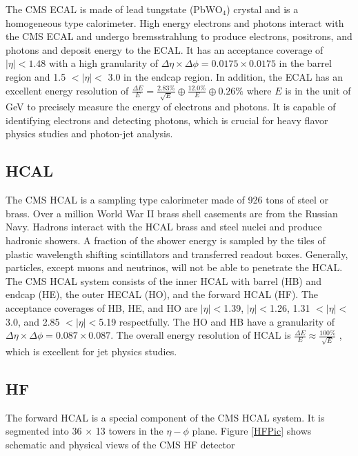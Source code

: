 The CMS ECAL is made of lead tungstate (PbWO$_4$) crystal and is a homogeneous type calorimeter. High energy electrons and photons interact with the CMS ECAL and undergo bremsstrahlung to produce electrons, positrons, and photons and deposit energy to the ECAL. It has an acceptance coverage of $|\eta| < 1.48$ with a high granularity of $\Delta \eta \times \Delta \phi = 0.0175 \times 0.0175$ in the barrel region and 1.5 $< |\eta| <$ 3.0 in the endcap region. In addition, the ECAL has an excellent energy resolution of $\frac{\Delta E}{E} = \frac{2.83\%}{\sqrt {E}} \oplus \frac{12.0\%}{E}  \oplus 0.26\%$ where $E$ is in the unit of GeV \cite{ECALReso} to precisely measure the energy of electrons and photons. It is capable of identifying electrons and detecting photons, which is crucial for heavy flavor physics studies and photon-jet analysis. 

\subsection{HCAL}

The CMS HCAL is a sampling type calorimeter made of 926 tons of steel or brass. Over a million World War II brass shell casements are from the Russian Navy. Hadrons interact with the HCAL brass and steel nuclei and produce hadronic showers. A fraction of the shower energy is sampled by the tiles of plastic wavelength shifting scintillators and transferred readout boxes. Generally, particles, except muons and neutrinos, will not be able to penetrate the HCAL. The CMS HCAL system consists of the inner HCAL with barrel (HB) and endcap (HE), the outer HECAL (HO), and the forward HCAL (HF). The acceptance coverages of HB, HE, and HO are $|\eta| < $1.39, $|\eta| < $1.26, 1.31 $< |\eta| < $3.0, and 2.85 $< |\eta| < $5.19 respectfully. The HO and HB have a granularity of $\Delta \eta \times \Delta \phi = 0.087 \times 0.087$. The overall energy resolution of HCAL is $\frac{\Delta E}{E} \approx \frac{100\%}{\sqrt {E}}$ \cite{HCALReport}, which is excellent for jet physics studies.

\subsection{HF}

The forward HCAL is a special component of the CMS HCAL system. It is segmented into 36 $\times$ 13 towers in the $\eta - \phi$ plane. Figure \ref{HFPic} shows schematic and physical views of the CMS HF detector \cite{HFInfo}

